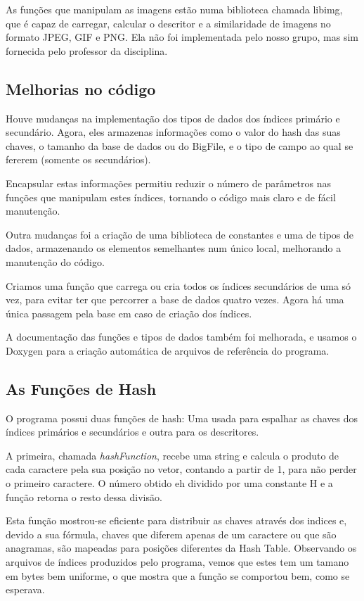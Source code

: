 As funções que manipulam as imagens estão numa biblioteca chamada libimg, que é
capaz de carregar, calcular o descritor e a similaridade de imagens no formato
JPEG, GIF e PNG. Ela não foi implementada pelo nosso grupo, mas sim
fornecida pelo professor da disciplina.

\subsection{Melhorias no código}
Houve mudanças na implementação dos tipos de dados dos índices primário e
secundário. Agora, eles armazenas informações como o valor do hash das suas
chaves, o tamanho da base de dados ou do BigFile, e o tipo de campo ao qual 
se fererem (somente os secundários).

Encapsular estas informações permitiu reduzir o número de parâmetros nas
funções que manipulam estes índices, tornando o código mais claro e de fácil
manutenção.

Outra mudanças foi a criação de uma biblioteca de constantes e uma de tipos de
dados, armazenando os elementos semelhantes num único local, melhorando a
manutenção do código.

Criamos uma função que carrega ou cria todos os índices secundários de uma só
vez, para evitar ter que percorrer a base de dados quatro vezes. Agora há uma
única passagem pela base em caso de criação dos índices.

A documentação das funções e tipos de dados também foi melhorada, e usamos o
Doxygen para a criação automática de arquivos de referência do programa.

\subsection{As Funções de Hash}
O programa possui duas funções de hash: Uma usada para espalhar as chaves dos índices 
primários e secundários e outra para os descritores.

A primeira, chamada \textit{hashFunction}, recebe uma string e calcula o produto de cada caractere pela sua posição no vetor, contando a partir de 1, para não perder o primeiro caractere. O número obtido eh dividido por uma constante H e a função retorna o resto dessa divisão.

Esta função mostrou-se eficiente para distribuir as chaves através dos indices e, devido a sua fórmula, chaves que diferem apenas de um caractere ou que são anagramas, são mapeadas para posições diferentes da Hash Table. Observando os arquivos de índices produzidos pelo programa, vemos que estes tem um tamano em bytes bem uniforme, o que mostra que a função se comportou bem, como se esperava.

